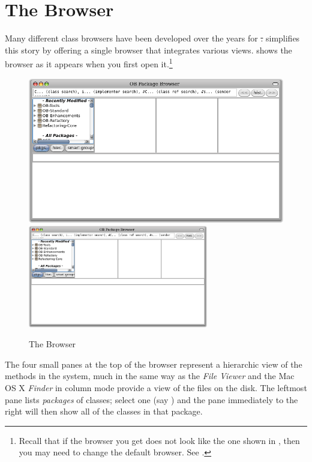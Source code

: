 \documentclass[a4paper,10pt,twoside]{book}
\begin{document}
\section{The Browser}

Many different class browsers have been developed over the years for \st.
\pharo simplifies this story by offering a single browser that integrates various views.
 shows the browser as it appears when you first open it.\footnote{Recall that if the browser you get does not look like the one shown in , then you may need to change the default browser.  See .}

\begin{figure}[htbp]
   \centering
   \ifluluelse
	 {\includegraphics[width=\textwidth]{SystemBrowser0} }
	 {\includegraphics[width=0.7\textwidth]{SystemBrowser0} }
   \caption{The Browser}
\end{figure}

The four small panes at the top of the browser represent a hierarchic view of the methods in the system, much in the same way as the  \textit{File Viewer} and the Mac OS X \textit{Finder} in column mode provide a view of the files on the disk.
The leftmost pane lists \emph{packages} of classes; select one (say ) and the pane immediately to the right will then show all of the classes in that package.
\end{document}
